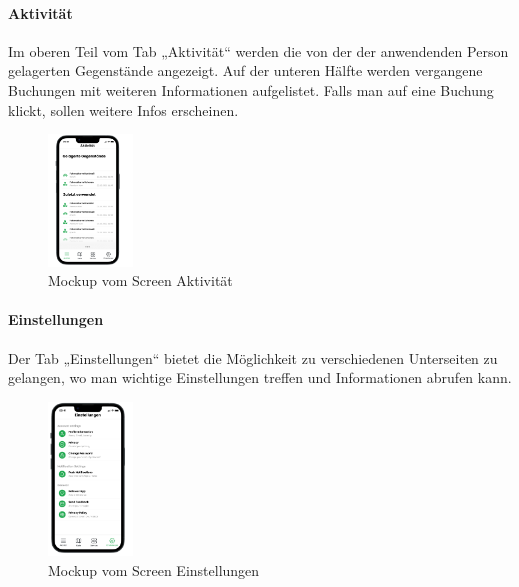 \paragraph{Aktivität}Im oberen Teil vom Tab „Aktivität“ werden die von der der anwendenden Person gelagerten Gegenstände angezeigt. Auf der unteren Hälfte werden vergangene Buchungen mit weiteren Informationen aufgelistet. Falls man auf eine Buchung klickt, sollen weitere Infos erscheinen.\\
\begin{figure}[H]
  \centering
  \includegraphics[width=0.2\textwidth]{images/app_mock_objects}
  \caption{Mockup vom Screen Aktivität}
  \label{fig:screenactivitymock}
\end{figure}

\paragraph{Einstellungen}Der Tab „Einstellungen“ bietet die Möglichkeit zu verschiedenen Unterseiten zu gelangen, wo man wichtige Einstellungen treffen und Informationen abrufen kann.\\
\begin{figure}[H]
  \centering
  \includegraphics[width=0.2\textwidth]{images/app_mock_settings}
  \caption{Mockup vom Screen Einstellungen}
  \label{fig:screensettingsmock}
\end{figure}

